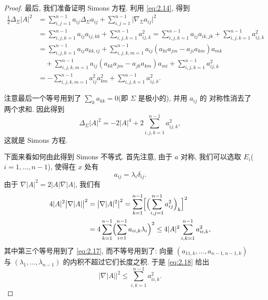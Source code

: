 \begin{proof}
最后, 我们准备证明 Simons 方程. 利用 \eqref{eq:2.14}, 得到
\begin{equation}
\begin{aligned}
\frac12\Delta_{\Sigma}|A|^{2}
&=\sum_{i,j=1}^{n-1}a_{ij}\Delta_{\Sigma}a_{ij}
 +\sum_{i,j=1}^{n-1}\bigl|\nabla_{\Sigma}a_{ij}\bigr|^{2}\\
&=\sum_{i,j,k=1}^{n-1}a_{ij}a_{ij,kk}+\sum_{i,j,k=1}^{n-1}a_{ij,k}^{2}
 =\sum_{i,j,k=1}^{n-1}a_{ij}a_{ik,jk}+\sum_{i,j,k=1}^{n-1}a_{ij,k}^{2}\\
&=\sum_{i,j,k=1}^{n-1}a_{ij}a_{kk,ij}
 +\sum_{i,j,k,m=1}^{n-1}a_{ij}(a_{ki}a_{jm}-a_{ji}a_{km})a_{mk}\\
&\quad +\sum_{i,j,k,m=1}^{n-1}a_{ij}(a_{kk}a_{jm}-a_{jk}a_{km})a_{mi}
 +\sum_{i,j,k=1}^{n-1}a_{ij,k}^{2}\\
&=-\sum_{i,j,k,m=1}^{n-1}a_{ij}^{2}a_{km}^{2}
 +\sum_{i,j,k=1}^{n-1}a_{ij,k}^{2}.
\end{aligned}
\label{eq:2.15}
\end{equation}

注意最后一个等号用到了 $\sum_ka_{kk}=0$(即 $\Sigma$ 是极小的), 并用 $a_{ij}$ 的
对称性消去了两个求和. 因此得到
\begin{equation}
\Delta_{\Sigma}|A|^{2}=-2|A|^{4}
 +2\sum_{i,j,k=1}^{n-1}a_{ij,k}^{2},
\label{eq:2.16}
\end{equation}
这就是 Simons 方程.

下面来看如何由此得到 Simons 不等式. 首先注意, 由于 $a$ 对称, 我们可以选取
$E_i$($i=1,\dots,n-1$), 使得在 $x$ 处有
\begin{equation}
a_{ij}=\lambda_i\delta_{ij}.
\label{eq:2.17}
\end{equation}
由于 $\nabla|A|^{2}=2|A|\nabla|A|$, 我们有
\begin{equation}
\begin{aligned}
4|A|^{2}\bigl|\nabla|A|\bigr|^{2}
&=\bigl|\nabla|A|^{2}\bigr|^{2}
 =\sum_{k=1}^{n-1}\Bigl[\Bigl(\sum_{i,j=1}^{n-1}a_{ij}^{2}\Bigr)_{k}\Bigr]^{2}\\
&=4\sum_{k=1}^{n-1}\Bigl(\sum_{i=1}^{n-1}a_{ii,k}\lambda_i\Bigr)^{2}
 \leq4|A|^{2}\sum_{i,k=1}^{n-1}a_{ii,k}^{2},
\end{aligned}
\label{eq:2.18}
\end{equation}
其中第三个等号用到了 \eqref{eq:2.17}, 而不等号用到了: 向量 $(a_{11,k},\dots,
a_{n-1,n-1,k})$ 与 $(\lambda_1,\dots,\lambda_{n-1})$ 的内积不超过它们长度之积.
于是 \eqref{eq:2.18} 给出
\begin{equation}
\bigl|\nabla|A|\bigr|^{2}\leq\sum_{i,k=1}^{n-1}a_{ii,k}^{2}.
\label{eq:2.19}
\end{equation}


\end{proof}

